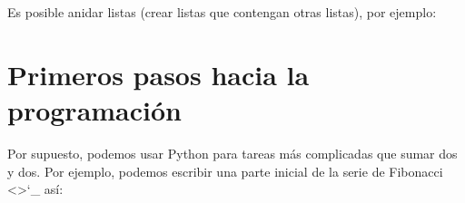 \documentclass[a4,10pt,spanish]{sphinxmanual}
\begin{document}
\sphinxAtStartPar
Es posible anidar listas (crear listas que contengan otras listas), por ejemplo:

\begin{sphinxVerbatim}[commandchars=\\\{\}]
  \PYG{p}{[}  \PYG{p}{]}
  \PYG{p}{[}  \PYG{p}{]}
  \PYG{p}{[} \PYG{p}{]}
\PYG{p}{[}\PYG{p}{]}
\PYG{p}{[}\PYG{p}{]}\PYG{p}{[}\PYG{p}{]}
\end{sphinxVerbatim}


\section{Primeros pasos hacia la programación}
\label{\detokenize{tutorial/introduction:first-steps-towards-programming}}\label{\detokenize{tutorial/introduction:tut-firststeps}}
\sphinxAtStartPar
Por supuesto, podemos usar Python para tareas más complicadas que sumar dos y dos. Por ejemplo, podemos escribir una parte inicial de la serie de Fibonacci <>`\_ así:

\begin{sphinxVerbatim}[commandchars=\\\{\}]
    
   
    
        
\end{sphinxVerbatim}
\end{document}
